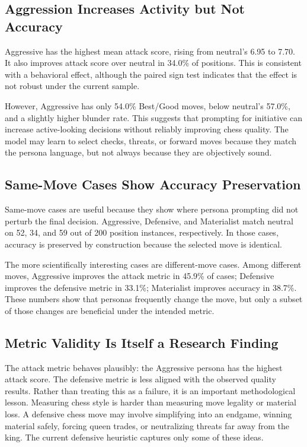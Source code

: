 \documentclass[10pt]{article}
\begin{document}
\subsection{Aggression Increases Activity but Not Accuracy}

Aggressive has the highest mean attack score, rising from neutral's 6.95 to 7.70. It also improves attack score over neutral in 34.0\% of positions. This is consistent with a behavioral effect, although the paired sign test indicates that the effect is not robust under the current sample.

However, Aggressive has only 54.0\% Best/Good moves, below neutral's 57.0\%, and a slightly higher blunder rate. This suggests that prompting for initiative can increase active-looking decisions without reliably improving chess quality. The model may learn to select checks, threats, or forward moves because they match the persona language, but not always because they are objectively sound.

\subsection{Same-Move Cases Show Accuracy Preservation}

Same-move cases are useful because they show where persona prompting did not perturb the final decision. Aggressive, Defensive, and Materialist match neutral on 52, 34, and 59 out of 200 position instances, respectively. In those cases, accuracy is preserved by construction because the selected move is identical.

The more scientifically interesting cases are different-move cases. Among different moves, Aggressive improves the attack metric in 45.9\% of cases; Defensive improves the defensive metric in 33.1\%; Materialist improves accuracy in 38.7\%. These numbers show that personas frequently change the move, but only a subset of those changes are beneficial under the intended metric.

\subsection{Metric Validity Is Itself a Research Finding}

The attack metric behaves plausibly: the Aggressive persona has the highest attack score. The defensive metric is less aligned with the observed quality results. Rather than treating this as a failure, it is an important methodological lesson. Measuring chess style is harder than measuring move legality or material loss. A defensive chess move may involve simplifying into an endgame, winning material safely, forcing queen trades, or neutralizing threats far away from the king. The current defensive heuristic captures only some of these ideas.
\end{document}
